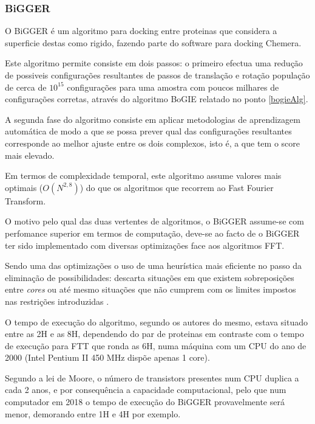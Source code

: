 \subsubsection{BiGGER}
\label{biggerAlg}
O BiGGER\cite{biggerPaper} é um algoritmo para docking entre proteinas que considera a superficie destas como rigido, fazendo parte do software para docking Chemera.

Este algoritmo permite consiste em dois passos: o primeiro efectua uma redução de possiveis configurações resultantes de passos de translação e rotação população de cerca de $10^{15}$ configurações para uma amostra com poucos milhares de configurações corretas, através do algoritmo BoGIE relatado no ponto \ref{bogieAlg}.

A segunda fase do algoritmo consiste em aplicar metodologias de aprendizagem automática de modo a que se possa prever qual das configurações resultantes corresponde ao melhor ajuste entre os dois complexos, isto é, a que tem o score mais elevado.
 
Em termos de complexidade temporal, este algoritmo assume valores mais optimais ($O(N^{2,8})$) do que os algoritmos que recorrem ao Fast Fourier Transform. 

O motivo pelo qual das duas vertentes de algoritmos, o BiGGER assume-se com perfomance superior em termos de computação, deve-se ao facto de o BiGGER ter sido implementado com diversas optimizações face aos algoritmos FFT. 

Sendo uma das optimizações o uso de uma heurística mais eficiente no passo da eliminação de possibilidades: descarta situações em que existem sobreposições entre \textit{cores} ou até mesmo situações que não cumprem com os limites impostos nas restrições introduzidas . 

O tempo de execução do algoritmo, segundo os autores do mesmo, estava situado entre as 2H e as 8H, dependendo do par de proteinas em contraste com o tempo de execução para FTT que ronda as 6H, numa máquina com um CPU do ano de 2000 (Intel Pentium II 450 MHz dispõe apenas 1 core). 

Segundo a lei de Moore, o número de transistors presentes num CPU duplica a cada 2 anos, e por consequência a capacidade computacional, pelo que num computador em 2018 o tempo de execução do BiGGER provavelmente será menor, demorando entre 1H e 4H por exemplo.
